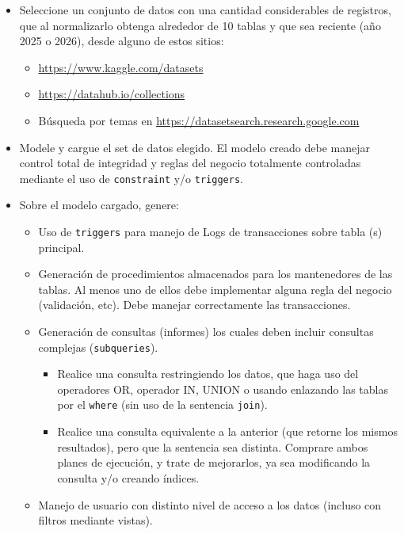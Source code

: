 \documentclass[11pt,a4paper]{article}
\begin{document}
\begin{itemize}
    \item Seleccione un conjunto de datos con una cantidad considerables de
    registros, que al normalizarlo obtenga alrededor de 10 tablas y que sea
    reciente (año 2025 o 2026), desde alguno de estos sitios:
    \begin{itemize}
        \item \url{https://www.kaggle.com/datasets}
        \item \url{https://datahub.io/collections}
        \item Búsqueda por temas en
        \url{https://datasetsearch.research.google.com}
    \end{itemize}

    \item Modele y cargue el set de datos elegido. El modelo creado debe manejar
    control total de integridad y reglas del negocio totalmente controladas
    mediante el uso de \texttt{constraint} y/o \texttt{triggers}.

    \item Sobre el modelo cargado, genere:
    \begin{itemize}
        \item Uso de \texttt{triggers} para manejo de Logs de transacciones sobre
        tabla (s) principal.

        \item Generación de procedimientos almacenados para los mantenedores de
        las tablas. Al menos uno de ellos debe implementar alguna regla del
        negocio (validación, etc). Debe manejar correctamente las transacciones.

        \item Generación de consultas (informes) los cuales deben incluir
        consultas complejas (\texttt{subqueries}).
        \begin{itemize}
            \item Realice una consulta restringiendo los datos, que haga uso del
            operadores OR, operador IN, UNION o usando enlazando las tablas por
            el \texttt{where} (sin uso de la sentencia \texttt{join}).

            \item Realice una consulta equivalente a la anterior (que retorne los
            mismos resultados), pero que la sentencia sea distinta. Comprare
            ambos planes de ejecución, y trate de mejorarlos, ya sea modificando
            la consulta y/o creando índices.
        \end{itemize}

        \item Manejo de usuario con distinto nivel de acceso a los datos (incluso
        con filtros mediante vistas).
    \end{itemize}
\end{itemize}
\end{document}
